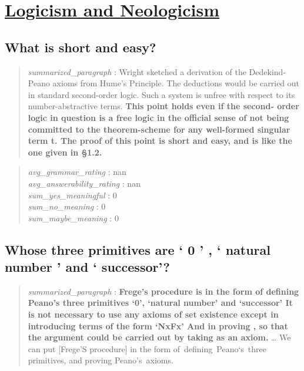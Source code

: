 \hypertarget{logicism-and-neologicism}{%
\section{\texorpdfstring{\href{https://plato.stanford.edu/entries/logicism/index.html}{Logicism
and
Neologicism}}{Logicism and Neologicism}}\label{logicism-and-neologicism}}

\hypertarget{what-is-short-and-easy}{%
\subsection{What is short and easy?}\label{what-is-short-and-easy}}

\begin{quote}
\emph{summarized\_paragraph} : Wright sketched a derivation of the
Dedekind-Peano axioms from Hume's Principle. The deductions would be
carried out in standard second-order logic. Such a system is unfree with
respect to its number-abstractive terms. \textbf{This point holds even
if the second- order logic in question is a free logic in the official
sense of not being committed to the theorem-scheme for any well-formed
singular term t. The proof of this point is short and easy, and is like
the one given in §1.2.}
\end{quote}

\begin{quote}
\emph{avg\_grammar\_rating} : nan\\
\emph{avg\_answerability\_rating} : nan\\
\emph{sum\_yes\_meaningful} : 0\\
\emph{sum\_no\_meaning} : 0\\
\emph{sum\_maybe\_meaning} : 0
\end{quote}

\hypertarget{whose-three-primitives-are-0-natural-number-and-successor}{%
\subsection{Whose three primitives are ` 0 ' , ` natural number ' and `
successor'?}\label{whose-three-primitives-are-0-natural-number-and-successor}}

\begin{quote}
\emph{summarized\_paragraph} : \textbf{Frege's procedure is in the form
of defining Peano's three primitives `0', `natural number' and
`successor' It is not necessary to use any axioms of set existence
except in introducing terms of the form `NxFx' And in proving , so that
the argument could be carried out by taking as an axiom.} \ldots{} We
can put {[}Frege'S procedure{]} in the form of~defining~Peano`s~three
primitives, and proving Peano's~axioms.
\end{quote}

